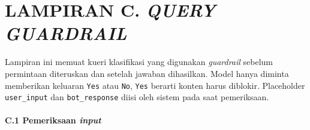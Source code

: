 \clearpage
\chapter*{LAMPIRAN C. \emph{QUERY GUARDRAIL}}

Lampiran ini memuat kueri klasifikasi yang digunakan \emph{guardrail} sebelum
permintaan diteruskan dan setelah jawaban dihasilkan. Model hanya diminta
memberikan keluaran \texttt{Yes} atau \texttt{No}, \texttt{Yes} berarti konten
harus diblokir. Placeholder \texttt{user\_input} dan \texttt{bot\_response}
diisi oleh sistem pada saat pemeriksaan.

\subsubsection*{C.1 Pemeriksaan \emph{input}}
